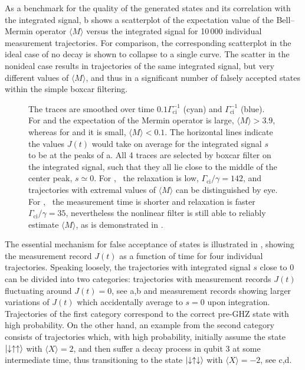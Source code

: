As a benchmark for the quality of the generated states and its correlation with the integrated signal, b shows a scatterplot of the expectation value of the Bell--Mermin operator $\langle M \rangle$ versus the integrated signal for 10\,000 individual measurement trajectories. For comparison, the corresponding scatterplot in the ideal case of no decay is shown to collapse to a single curve. The scatter in the nonideal case results in trajectories of the same integrated signal, but very different values of $\langle M \rangle$, and thus in a significant number of falsely accepted states within the simple boxcar filtering.
\begin{figure}
\centering
{}
\caption[Time traces of the signal $J(t)$ for individual quantum trajectories]
{
  The traces are smoothed over time $0.1 \Gamma_{\text{ci}}^{-1}$ (cyan) and $\Gamma_{\text{ci}}^{-1}$ (blue). For  and  the expectation of the Mermin operator is large, $\langle M \rangle>3.9$, whereas for  and  it is small, $\langle M \rangle <0.1$. The horizontal lines indicate the values $J(t)$ would take on average for the integrated signal $s$ to be at the peaks of a. All 4 traces are selected by boxcar filter on the integrated signal, such that they all lie close to the middle of the center peak, $s\simeq0$. For ,~ the relaxation is low, $\Gamma_{\text{ci}}/\gamma=142$, and trajectories with extremal values of $\langle M \rangle$ can be distinguished by eye. For ,~ the measurement time is shorter and relaxation is faster $\Gamma_{\text{ci}}/\gamma=35$, nevertheless the nonlinear filter is still able to reliably estimate $\langle M \rangle$, as is demonstrated in .\label{fig:fig3}}
\end{figure}

The essential mechanism for false acceptance of states is illustrated in , showing the measurement record $J(t)$ as a function of time for four individual trajectories. Speaking loosely, the trajectories with integrated signal $s$ close to $0$ can be divided into two categories: trajectories with measurement records $J(t)$ fluctuating around $J(t)=0$, see a,b and measurement records showing larger variations of $J(t)$ which accidentally average to $s=0$ upon integration. Trajectories of the first category correspond to the correct pre-GHZ state with high probability. On the other hand, an example from the second category consists of trajectories which, with high probability,  initially assume the state $\left\lvert \downarrow\uparrow\uparrow \right\rangle$ with $\langle X \rangle =2$, and then suffer a decay process in qubit 3 at some intermediate time, thus transitioning to the state $\left\lvert \downarrow\uparrow\downarrow \right\rangle$ with $\langle X \rangle =-2$, see c,d.

